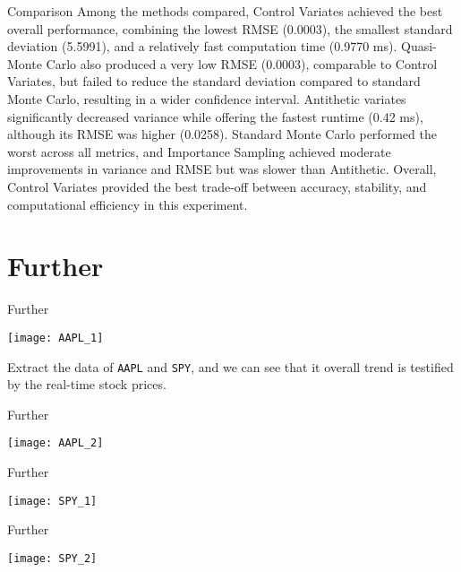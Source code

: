 \documentclass[aspectratio=169,xcolor=dvipsnames]{beamer}
\begin{document}
	\begin{frame}{Comparison}
	Among the methods compared, Control Variates achieved the best overall performance, combining the lowest RMSE (0.0003), the smallest standard deviation (5.5991), and a relatively fast computation time (0.9770 ms). Quasi-Monte Carlo also produced a very low RMSE (0.0003), comparable to Control Variates, but failed to reduce the standard deviation compared to standard Monte Carlo, resulting in a wider confidence interval. Antithetic variates significantly decreased variance while offering the fastest runtime (0.42 ms), although its RMSE was higher (0.0258). Standard Monte Carlo performed the worst across all metrics, and Importance Sampling achieved moderate improvements in variance and RMSE but was slower than Antithetic. Overall, Control Variates provided the best trade-off between accuracy, stability, and computational efficiency in this experiment.
	
		\end{frame}
		\section{Further}
	\begin{frame}{Further}
				\begin{center}
		\texttt{[image: AAPL\_1]}
				\end{center}
					Extract the data of \texttt{AAPL} and \texttt{SPY}, and we can see that it overall trend is testified by the real-time stock prices.
					
					
			\end{frame}
		
		\begin{frame}{Further}
					\begin{center}
			\texttt{[image: AAPL\_2]}
			\end{center}
		
		
		
		\end{frame}
	
	\begin{frame}{Further}
		\begin{center}
			\texttt{[image: SPY\_1]}
		\end{center}
		
		
		
	\end{frame}

\begin{frame}{Further}
	\begin{center}
		\texttt{[image: SPY\_2]}
	\end{center}
	
	
	
\end{frame}
		
\end{document}
